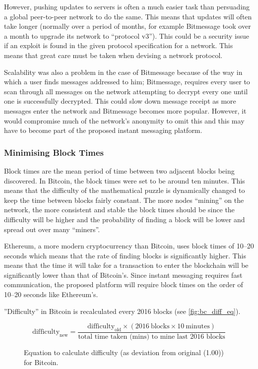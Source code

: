 \documentclass{article}
\begin{document}
However, pushing updates to servers is often a much easier task than persuading a global peer-to-peer network to do the same. This means that updates will often take longer (normally over a period of months, for example Bitmessage took over a month to upgrade its network to ``protocol v3''\cite{bitmessage_protocol_v3}). This could be a security issue if an exploit is found in the given protocol specification for a network. This means that great care must be taken when devising a network protocol.

Scalability was also a problem in the case of Bitmessage because of the way in which a user finds messages addressed to him; Bitmessage, requires every user to scan through all messages on the network attempting to decrypt every one until one is successfully decrypted. This could slow down message receipt as more messages enter the network and Bitmessage becomes more popular. However, it would compromise much of the network's anonymity to omit this and this may have to become part of the proposed instant messaging platform.

\subsubsection{Minimising Block Times}
Block times are the mean period of time between two adjacent blocks being discovered. In Bitcoin, the block times were set to be around ten minutes. This means that the difficulty of the mathematical puzzle is dynamically changed to keep the time between blocks fairly constant. The more nodes ``mining'' on the network, the more consistent and stable the block times should be since the difficulty will be higher and the probability of finding a block will be lower and spread out over many ``miners''.

Ethereum\cite{ethereum_intro_paper}, a more modern cryptocurrency than Bitcoin, uses block times of 10--20 seconds which means that the rate of finding blocks is significantly higher. This means that the time it will take for a transaction to enter the blockchain will be significantly lower than that of Bitcoin's. Since instant messaging requires fast communication, the proposed platform will require block times on the order of 10--20 seconds like Ethereum's.

''Difficulty'' in Bitcoin is recalculated every 2016 blocks (see \autoref{fig:bc_diff_eq}).
\begin{figure}[h]
    \[\textrm{difficulty}_{\textrm{new}} = \frac{\textrm{difficulty}_{\textrm{old}} \times (2016\ \textrm{blocks} \times 10\ \textrm{minutes})}{\textrm{total time taken (mins) to mine last 2016 blocks}}\]
    \caption{Equation to calculate difficulty (as deviation from original (1.00)) for Bitcoin.\cite{medium_bt_mystery}}
    \label{fig:bc_diff_eq}
\end{figure}
\end{document}
